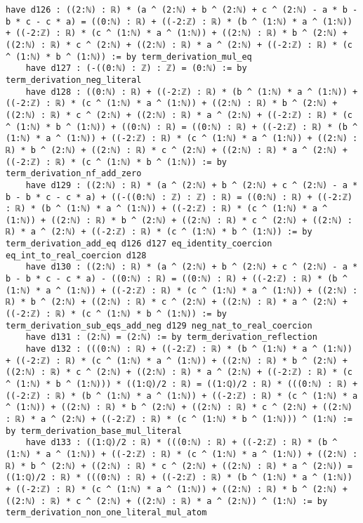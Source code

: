\documentclass{article}
\begin{document}
\begin{tcolorbox}[colback=white!10, width=\linewidth]
\begin{lstlisting}[language=Lean4]
    have d126 : ((2:ℕ) : ℝ) * (a ^ (2:ℕ) + b ^ (2:ℕ) + c ^ (2:ℕ) - a * b - b * c - c * a) = ((0:ℕ) : ℝ) + ((-2:ℤ) : ℝ) * (b ^ (1:ℕ) * a ^ (1:ℕ)) + ((-2:ℤ) : ℝ) * (c ^ (1:ℕ) * a ^ (1:ℕ)) + ((2:ℕ) : ℝ) * b ^ (2:ℕ) + ((2:ℕ) : ℝ) * c ^ (2:ℕ) + ((2:ℕ) : ℝ) * a ^ (2:ℕ) + ((-2:ℤ) : ℝ) * (c ^ (1:ℕ) * b ^ (1:ℕ)) := by term_derivation_mul_eq
    have d127 : (-((0:ℕ) : ℤ) : ℤ) = (0:ℕ) := by term_derivation_neg_literal
    have d128 : ((0:ℕ) : ℝ) + ((-2:ℤ) : ℝ) * (b ^ (1:ℕ) * a ^ (1:ℕ)) + ((-2:ℤ) : ℝ) * (c ^ (1:ℕ) * a ^ (1:ℕ)) + ((2:ℕ) : ℝ) * b ^ (2:ℕ) + ((2:ℕ) : ℝ) * c ^ (2:ℕ) + ((2:ℕ) : ℝ) * a ^ (2:ℕ) + ((-2:ℤ) : ℝ) * (c ^ (1:ℕ) * b ^ (1:ℕ)) + ((0:ℕ) : ℝ) = ((0:ℕ) : ℝ) + ((-2:ℤ) : ℝ) * (b ^ (1:ℕ) * a ^ (1:ℕ)) + ((-2:ℤ) : ℝ) * (c ^ (1:ℕ) * a ^ (1:ℕ)) + ((2:ℕ) : ℝ) * b ^ (2:ℕ) + ((2:ℕ) : ℝ) * c ^ (2:ℕ) + ((2:ℕ) : ℝ) * a ^ (2:ℕ) + ((-2:ℤ) : ℝ) * (c ^ (1:ℕ) * b ^ (1:ℕ)) := by term_derivation_nf_add_zero
    have d129 : ((2:ℕ) : ℝ) * (a ^ (2:ℕ) + b ^ (2:ℕ) + c ^ (2:ℕ) - a * b - b * c - c * a) + ((-((0:ℕ) : ℤ) : ℤ) : ℝ) = ((0:ℕ) : ℝ) + ((-2:ℤ) : ℝ) * (b ^ (1:ℕ) * a ^ (1:ℕ)) + ((-2:ℤ) : ℝ) * (c ^ (1:ℕ) * a ^ (1:ℕ)) + ((2:ℕ) : ℝ) * b ^ (2:ℕ) + ((2:ℕ) : ℝ) * c ^ (2:ℕ) + ((2:ℕ) : ℝ) * a ^ (2:ℕ) + ((-2:ℤ) : ℝ) * (c ^ (1:ℕ) * b ^ (1:ℕ)) := by term_derivation_add_eq d126 d127 eq_identity_coercion eq_int_to_real_coercion d128
    have d130 : ((2:ℕ) : ℝ) * (a ^ (2:ℕ) + b ^ (2:ℕ) + c ^ (2:ℕ) - a * b - b * c - c * a) - ((0:ℕ) : ℝ) = ((0:ℕ) : ℝ) + ((-2:ℤ) : ℝ) * (b ^ (1:ℕ) * a ^ (1:ℕ)) + ((-2:ℤ) : ℝ) * (c ^ (1:ℕ) * a ^ (1:ℕ)) + ((2:ℕ) : ℝ) * b ^ (2:ℕ) + ((2:ℕ) : ℝ) * c ^ (2:ℕ) + ((2:ℕ) : ℝ) * a ^ (2:ℕ) + ((-2:ℤ) : ℝ) * (c ^ (1:ℕ) * b ^ (1:ℕ)) := by term_derivation_sub_eqs_add_neg d129 neg_nat_to_real_coercion
    have d131 : (2:ℕ) = (2:ℕ) := by term_derivation_reflection
    have d132 : (((0:ℕ) : ℝ) + ((-2:ℤ) : ℝ) * (b ^ (1:ℕ) * a ^ (1:ℕ)) + ((-2:ℤ) : ℝ) * (c ^ (1:ℕ) * a ^ (1:ℕ)) + ((2:ℕ) : ℝ) * b ^ (2:ℕ) + ((2:ℕ) : ℝ) * c ^ (2:ℕ) + ((2:ℕ) : ℝ) * a ^ (2:ℕ) + ((-2:ℤ) : ℝ) * (c ^ (1:ℕ) * b ^ (1:ℕ))) * ((1:ℚ)/2 : ℝ) = ((1:ℚ)/2 : ℝ) * (((0:ℕ) : ℝ) + ((-2:ℤ) : ℝ) * (b ^ (1:ℕ) * a ^ (1:ℕ)) + ((-2:ℤ) : ℝ) * (c ^ (1:ℕ) * a ^ (1:ℕ)) + ((2:ℕ) : ℝ) * b ^ (2:ℕ) + ((2:ℕ) : ℝ) * c ^ (2:ℕ) + ((2:ℕ) : ℝ) * a ^ (2:ℕ) + ((-2:ℤ) : ℝ) * (c ^ (1:ℕ) * b ^ (1:ℕ))) ^ (1:ℕ) := by term_derivation_base_mul_literal
    have d133 : ((1:ℚ)/2 : ℝ) * (((0:ℕ) : ℝ) + ((-2:ℤ) : ℝ) * (b ^ (1:ℕ) * a ^ (1:ℕ)) + ((-2:ℤ) : ℝ) * (c ^ (1:ℕ) * a ^ (1:ℕ)) + ((2:ℕ) : ℝ) * b ^ (2:ℕ) + ((2:ℕ) : ℝ) * c ^ (2:ℕ) + ((2:ℕ) : ℝ) * a ^ (2:ℕ)) = ((1:ℚ)/2 : ℝ) * (((0:ℕ) : ℝ) + ((-2:ℤ) : ℝ) * (b ^ (1:ℕ) * a ^ (1:ℕ)) + ((-2:ℤ) : ℝ) * (c ^ (1:ℕ) * a ^ (1:ℕ)) + ((2:ℕ) : ℝ) * b ^ (2:ℕ) + ((2:ℕ) : ℝ) * c ^ (2:ℕ) + ((2:ℕ) : ℝ) * a ^ (2:ℕ)) ^ (1:ℕ) := by term_derivation_non_one_literal_mul_atom

\end{lstlisting}
\end{tcolorbox}
\end{document}
